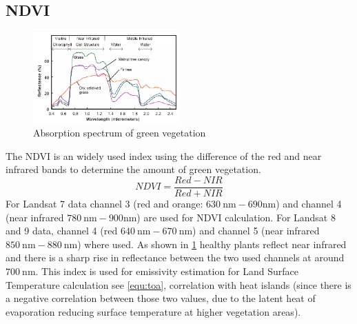 \subsection{\acf{NDVI}}
%
\noindent
\begin{figure}[!htbp]
    \centering
    \includegraphics[width=0.5\textwidth]{img/Reflectance-spectra-of-different-types-of-green-vegetation-compared-to-a-spectral.png}
    \caption{Absorption spectrum of green vegetation\cite[Fig. 2]{Govender2007}\label{fig:absorbtionVeg}}
\end{figure}
The \acf{NDVI} is an widely used index using the difference of the red and near infrared bands to determine the amount of green vegetation. 
\begin{equation}
    NDVI = \frac{Red-NIR}{Red+NIR}
    \label{equ:ndvi}
\end{equation}
For Landsat 7 data channel 3 (red and orange: $630\ \text{nm} - 690 \text{nm}$) and channel 4 (near infrared $780\ \text{nm} - 900 \text{nm}$) are used for \ac{NDVI} calculation.  
For Landsat 8 and 9 data, channel 4 (red $640\ \text{nm} - 670\ \text{nm}$) and channel 5 (near infrared $850\ \text{nm} - 880\ \text{nm}$) where used.
As shown in \cref{fig:absorbtionVeg} healthy plants reflect near infrared and there is a sharp rise in reflectance between the two used channels at around $700\ \text{nm}$. 
%
This index is used for emissivity estimation for Land Surface Temperature calculation see \cref{equ:toa}, correlation with heat islands (since there is a negative correlation between those two values, due to the latent heat of evaporation reducing surface temperature at higher vegetation areas).

